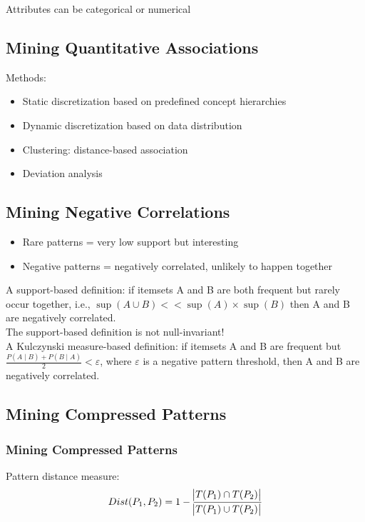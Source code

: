 Attributes can be categorical or numerical

\subsection{Mining Quantitative Associations}

Methods:
\begin{itemize}
\item Static discretization based on predefined concept hierarchies
\item Dynamic discretization based on data distribution
\item Clustering: distance-based association
\item Deviation analysis
\end{itemize}

\subsection{Mining Negative Correlations}
\begin{itemize}
\item Rare patterns = very low support but interesting
\item Negative patterns = negatively correlated, unlikely to happen together
\end{itemize}

A support-based definition: if itemsets A and B are both frequent but rarely occur together, i.e., $\sup(A \cup B) << \sup (A) \times \sup(B)$ then A and B are negatively correlated.\\

The support-based definition is not null-invariant!\\

A Kulczynski measure-based definition: if itemsets A and B are frequent but $\frac{P(A \mid B) + P(B \mid A)}{2} < \varepsilon$, where $\varepsilon$ is a negative pattern threshold, then A and B are negatively correlated.

\subsection{Mining Compressed Patterns}
\subsubsection{Mining Compressed Patterns}
Pattern distance measure:
\begin{equation*}
Dist(P_1, P_2)=1-\frac{\abs{T(P_1) \cap T(P_2)}}{\abs{T(P_1) \cup T(P_2)}}
\end{equation*}

